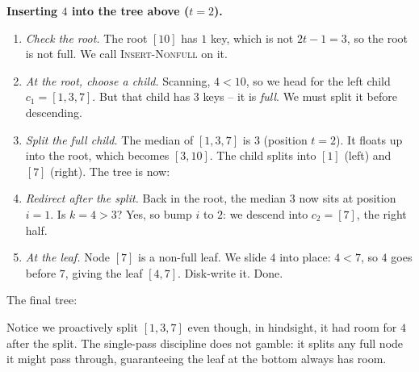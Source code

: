 \begin{center}
\end{center}

\begin{labbox}
\textbf{Inserting $4$ into the tree above ($t=2$).}
\begin{enumerate}
\item \emph{Check the root.} The root $[10]$ has $1$ key, which is not $2t-1 = 3$,
so the root is not full. We call \textsc{Insert-Nonfull} on it.
\item \emph{At the root, choose a child.} Scanning, $4 < 10$, so we head for the
left child $c_1 = [1,3,7]$. But that child has $3$ keys -- it is \emph{full}. We
must split it before descending.
\item \emph{Split the full child.} The median of $[1,3,7]$ is $3$ (position
$t = 2$). It floats up into the root, which becomes $[3,10]$. The child splits into
$[1]$ (left) and $[7]$ (right). The tree is now:
\begin{center}
\end{center}
\item \emph{Redirect after the split.} Back in the root, the median $3$ now sits at
position $i=1$. Is $k=4 > 3$? Yes, so bump $i$ to $2$: we descend into $c_2 = [7]$,
the right half.
\item \emph{At the leaf.} Node $[7]$ is a non-full leaf. We slide $4$ into place:
$4 < 7$, so $4$ goes before $7$, giving the leaf $[4,7]$. Disk-write it. Done.
\end{enumerate}
The final tree:
\begin{center}
\end{center}
Notice we proactively split $[1,3,7]$ even though, in hindsight, it had room for
$4$ after the split. The single-pass discipline does not gamble: it splits any full
node it might pass through, guaranteeing the leaf at the bottom always has room.
\end{labbox}

